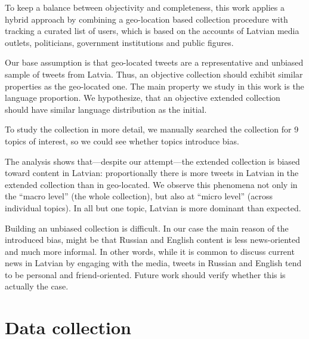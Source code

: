 \documentclass{IOS-Book-Article}
\begin{document}
To keep a balance between objectivity and completeness, this work applies a hybrid approach by combining a geo-location based collection procedure with tracking a curated list of users, which is based on the accounts of Latvian media outlets, politicians, government institutions and public figures.

Our base assumption is that geo-located tweets are a representative and unbiased sample of tweets from Latvia. Thus, an objective collection should exhibit similar properties as the geo-located one. The main property we study in this work is the language proportion. We hypothesize, that an objective extended collection should have similar language distribution as the initial.

To study the collection in more detail, we manually searched the collection for 9 topics of interest, so we could see whether topics introduce bias.


The analysis shows that---despite our attempt---the extended collection is biased toward content in Latvian: proportionally there is more tweets in Latvian in the extended collection than in geo-located. We observe this phenomena not only in the ``macro level'' (the whole collection), but also at ``micro level'' (across individual topics). In all but one topic, Latvian is more dominant than expected.


Building an unbiased collection is difficult.  In our case the main reason of the introduced bias, might be that Russian and English content is less news-oriented and much more informal. In other words, while it is common to discuss current news in Latvian by engaging with the media, tweets in Russian and English tend to be personal and friend-oriented. Future work should verify whether this is actually the case.

\section{Data collection}
\label{sec:data-collection}
\end{document}
